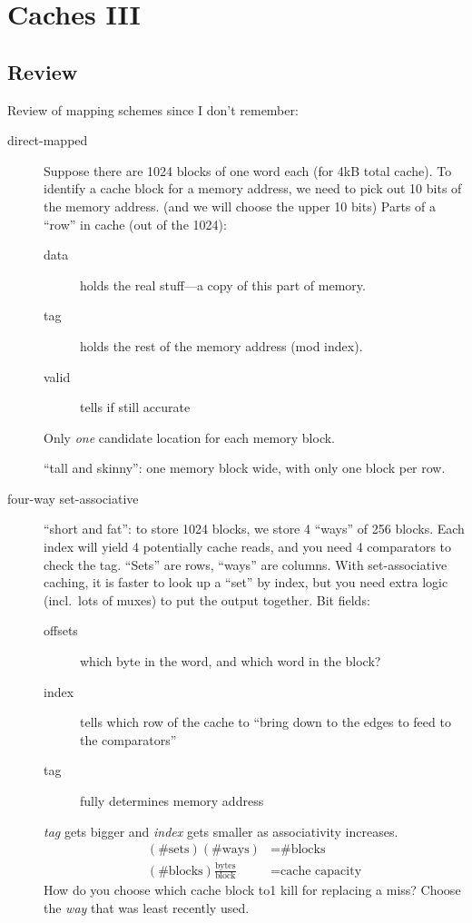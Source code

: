 \chapter{Caches III}
\section{Review}
Review of mapping schemes since I don't remember:
\begin{description}
	\item[direct-mapped] Suppose there are 1024 blocks of one word each (for 4kB total cache). To identify a cache block for a memory address, we need to pick out 10 bits of the memory address. (and we will choose the upper 10 bits) Parts of a ``row'' in cache (out of the 1024):
		\begin{description}
			\item[data] holds the real stuff---a copy of this part of memory.
			\item[tag] holds the rest of the memory address (mod index).
			\item [valid] tells if still accurate
		\end{description}
		Only \emph{one} candidate location for each memory block.
		
		``tall and skinny'': one memory block wide, with only one block per row.
	\item [four-way set-associative] ``short and fat'': to store 1024 blocks, we store 4 ``ways'' of 256 blocks. Each index will yield 4 potentially cache reads, and you need 4 comparators to check the tag. ``Sets'' are rows, ``ways'' are columns. With set-associative caching, it is faster to look up a ``set'' by index, but you need extra logic (incl.~lots of muxes) to put the output together. Bit fields:
	\begin{description}
		\item[offsets] which byte in the word, and which word in the block?
		\item [index] tells which row of the cache to ``bring down to the edges to feed to the comparators''
		\item[tag] fully determines memory address
	\end{description}
	\emph{tag} gets bigger and \emph{index} gets smaller as associativity increases.	
	\begin{align}
		\left(\text{\# sets}\right)\left(\text{\# ways}\right) &= \text{\# blocks} \\
		\left(\text{\# blocks}\right)\frac{\text{bytes}}{\text{block}} &= \text{cache capacity}
	\end{align}	
	How do you choose which cache block to1 kill for replacing a miss? Choose the \emph{way} that was least recently used.
\end{description}

